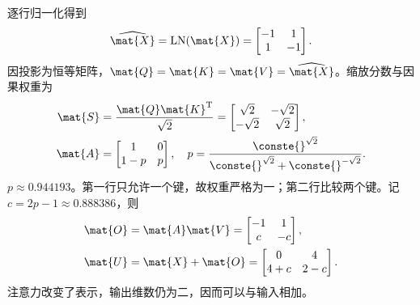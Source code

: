 \documentclass[../textbook.tex]{subfiles}
\begin{document}
\begin{example}
逐行归一化得到
\begin{equation*}
 \widehat{\mat{X}}=\operatorname{LN}(\mat{X})=\begin{bmatrix}-1&1\\1&-1\end{bmatrix}.
\end{equation*}
因投影为恒等矩阵，$\mat{Q}=\mat{K}=\mat{V}=\widehat{\mat{X}}$。缩放分数与因果权重为
\begin{align*}
 \mat{S}&=\frac{\mat{Q}\mat{K}^{\mathrm{T}}}{\sqrt2}
 =\begin{bmatrix}\sqrt2&-\sqrt2\\-\sqrt2&\sqrt2\end{bmatrix},\\
 \mat{A}&=\begin{bmatrix}1&0\\1-p&p\end{bmatrix},
 \quad p=\frac{\conste{}^{\sqrt2}}{\conste{}^{\sqrt2}+\conste{}^{-\sqrt2}}.
\end{align*}
$p\approx0.944193$。第一行只允许一个键，故权重严格为一；第二行比较两个键。记 $c=2p-1\approx0.888386$，则
\begin{align*}
 \mat{O}&=\mat{A}\mat{V}=\begin{bmatrix}-1&1\\c&-c\end{bmatrix},\\
 \mat{U}&=\mat{X}+\mat{O}=\begin{bmatrix}0&4\\4+c&2-c\end{bmatrix}.
\end{align*}
注意力改变了表示，输出维数仍为二，因而可以与输入相加。


\end{example}
\end{document}
